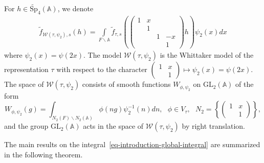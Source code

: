 \documentclass[11pt]{amsart}
\theoremstyle{definition}
\theoremstyle{remark}
\begin{document}
For $h\in \widetilde{\mathrm{Sp}}_4(\mathbb{A})$, we denote
\begin{equation*}
\begin{split}
\tilde{f}_{\mathcal{W}(\tau,\psi_2), s}(h)= \int\limits_{F\backslash \mathbb{A}}  \tilde{f}_{\tau, s}  \left(   \left(\begin{smallmatrix}  1 & x &&\\&1&&\\&&1&-x\\&&&1\end{smallmatrix}\right)  h \right) \psi_2(x)dx
\end{split}
\end{equation*}
where $\psi_2(x)=\psi(2x)$. The model $\mathcal{W}(\tau, \psi_2)$ is the Whittaker model of the representation $\tau$ with respect to the character $\left(\begin{smallmatrix} 1 & x\\ & 1\end{smallmatrix}\right) \mapsto \psi_2(x)=\psi(2x)$. The space of $\mathcal{W}(\tau, \psi_2)$ consists of smooth functions $W_{\phi, \psi_2}$ on $\mathrm{GL}_2(\mathbb{A})$ of the form 
$$
W_{\phi, \psi_2}(g)=\int_{N_2(F)\backslash N_2(\mathbb{A})}\phi(ng)\psi^{-1}_2(n)dn, \ \ \ \phi\in V_\tau, \ \ \ N_{2}=\left\{\left(\begin{smallmatrix} 1 & x\\ & 1\end{smallmatrix}\right) \right\},
$$
and the group $\mathrm{GL}_2(\mathbb{A})$ acts in the space  of $\mathcal{W}(\tau, \psi_2)$ by right translation.

The main results on the integral~\eqref{eq-introduction-global-integral} are summarized in the following theorem. 
\end{document}
